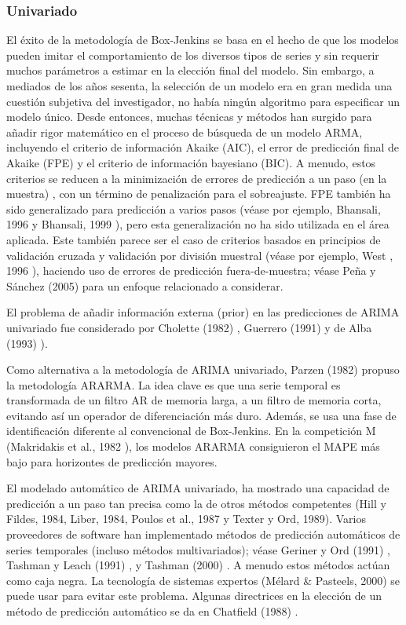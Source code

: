 \documentclass{llncs}
\begin{document}
\subsubsection{Univariado}

El éxito de la metodología de Box-Jenkins se basa en el hecho de que los modelos pueden imitar el comportamiento de los diversos tipos de series y sin requerir muchos parámetros a estimar en la elección final del modelo. Sin embargo, a mediados de los años sesenta, la selección de un modelo era en gran medida una cuestión subjetiva del investigador, no había ningún algoritmo para especificar un modelo único. Desde entonces, muchas técnicas y métodos han surgido para añadir rigor matemático en el proceso de búsqueda de un modelo ARMA, incluyendo el criterio de información Akaike (AIC), el error de predicción final de Akaike (FPE) y el criterio de información bayesiano (BIC). A menudo, estos criterios se reducen a la minimización de errores de predicción a un paso (en la muestra) , con un término de penalización para el sobreajuste. FPE también ha sido generalizado para predicción a varios pasos (véase por ejemplo, Bhansali, 1996 \cite{Bhansali1996577} y Bhansali, 1999 \cite{Bhansali1999295}), pero esta generalización no ha sido utilizada en el área aplicada. Este también parece ser el caso de criterios basados en principios de validación cruzada y validación por división muestral (véase por ejemplo, West , 1996 \cite{West19961084}), haciendo uso de errores de predicción fuera-de-muestra; véase Peña y Sánchez (2005) \cite{Pena2005135} para un enfoque relacionado a considerar.

El problema de añadir información externa (prior) en las predicciones de ARIMA univariado fue considerado por Cholette (1982) \cite{Cholette1982375}, Guerrero (1991) \cite{Guerrero1991339} y de Alba (1993) \cite{deAlba199395}).

Como alternativa a la metodología de ARIMA univariado, Parzen (1982) \cite{Parzen198267} propuso la metodología ARARMA. La idea clave es que una serie temporal es transformada de un filtro AR de memoria larga, a un filtro de memoria corta, evitando así un operador de diferenciación más duro. Además, se usa una fase de identificación diferente al convencional de Box-Jenkins. En la competición M (Makridakis et al., 1982 \cite{Makridakis1982111}), los modelos ARARMA consiguieron el MAPE más bajo para horizontes de predicción mayores. 

El modelado automático de ARIMA univariado, ha mostrado una capacidad de predicción a un paso tan precisa como la de otros métodos competentes (Hill y Fildes, 1984, Liber, 1984, Poulos et al., 1987 y Texter y Ord, 1989). Varios proveedores de software han implementado métodos de predicción automáticos de series temporales (incluso métodos multivariados); véase Geriner y Ord (1991) \cite{Geriner1991127}, Tashman y Leach (1991) \cite{Tashman1991209}, y Tashman (2000) \cite{Tashman2000437}. A menudo estos métodos actúan como caja negra. La tecnología de sistemas expertos (Mélard \& Pasteels, 2000) se puede usar para evitar este problema. Algunas directrices en la elección de un método de predicción automático se da en Chatfield (1988) \cite{Chatfield198819}.
\end{document}
